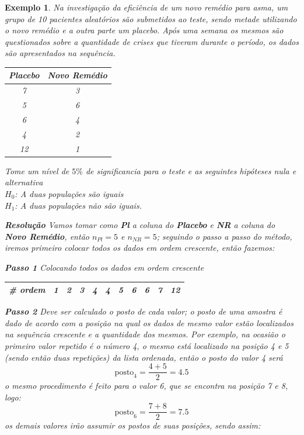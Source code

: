 \documentclass[
]{book}
\newtheorem{example}{Exemplo}
\begin{document}
\begin{example}
Na investigação da eficiência de um novo remédio para asma, um grupo de 10 pacientes aleatórios são submetidos ao teste, sendo metade utilizando o novo remédio e a outra parte um placebo. Após uma semana os mesmos são questionados sobre a quantidade de crises que tiveram durante o período, os dados são apresentados na sequência.

\begin{longtable}[]{@{}cc@{}}
\toprule
\textbf{Placebo} & \textbf{Novo Remédio} \\
\midrule
\endhead
7 & 3 \\
5 & 6 \\
6 & 4 \\
4 & 2 \\
12 & 1 \\
\bottomrule
\end{longtable}

Tome um nível de \(5\%\) de significancia para o teste e as seguintes hipóteses nula e alternativa\\
\(H_0\): A duas populações são iguais\\
\(H_1\): A duas populações não são iguais.

\textbf{Resolução} Vamos tomar como \textbf{Pl} a coluna do \textbf{Placebo} e \textbf{NR} a coluna do \textbf{Novo Remédio}, então \(n_{Pl} = 5\) e \(n_{NR} = 5\); seguindo o passo a passo do método, iremos primeiro colocar todos os dados em ordem crescente, então fazemos:

\textbf{Passo 1} Colocando todos os dados em ordem crescente

\begin{longtable}[]{@{}cllllllllll@{}}
\toprule
\# ordem & 1 & 2 & 3 & 4 & 4 & 5 & 6 & 6 & 7 & 12 \\
\midrule
\endhead
\bottomrule
\end{longtable}

\textbf{Passo 2} Deve ser calculado o posto de cada valor; o posto de uma amostra é dado de acordo com a posição na qual os dados de mesmo valor estão localizados na sequência crescente e a quantidade dos mesmos. Por exemplo, na ocasião o primeiro valor repetido é o número 4, o mesmo está localizado na posição 4 e 5 (sendo então duas repetições) da lista ordenada, então o posto do valor 4 será
\[
\text{posto}_4 = \frac{4+5}{2} = 4.5
\]
o mesmo procedimento é feito para o valor 6, que se encontra na posição 7 e 8, logo:
\[
\text{posto}_6 = \frac{7+8}{2} = 7.5
\]
os demais valores irão assumir os postos de suas posições, sendo assim:


\end{example}
\end{document}

